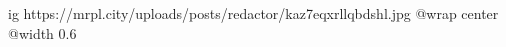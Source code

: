  
 
 
 
 

\ifcmt
  ig https://mrpl.city/uploads/posts/redactor/kaz7eqxrllqbdshl.jpg
  @wrap center
  @width 0.6
\fi
